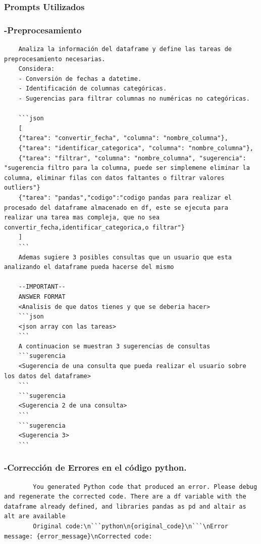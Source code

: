 \begin{anexos}
	\subsubsection{Prompts Utilizados}
	\subsubsection{-Preprocesamiento}
	\begin{lstlisting}
	Analiza la información del dataframe y define las tareas de preprocesamiento necesarias.
	Considera:
	- Conversión de fechas a datetime.
	- Identificación de columnas categóricas.
	- Sugerencias para filtrar columnas no numéricas no categóricas.
	
	```json
	[
	{"tarea": "convertir_fecha", "columna": "nombre_columna"},
	{"tarea": "identificar_categorica", "columna": "nombre_columna"},
	{"tarea": "filtrar", "columna": "nombre_columna", "sugerencia": "sugerencia filtro para la columna, puede ser simplemene eliminar la columna, eliminar filas con datos faltantes o filtrar valores outliers"}
	{"tarea": "pandas","codigo":"codigo pandas para realizar el procesado del dataframe almacenado en df, este se ejecuta para realizar una tarea mas compleja, que no sea convertir_fecha,identificar_categorica,o filtrar"}
	]
	```
	Ademas sugiere 3 posibles consultas que un usuario que esta analizando el dataframe pueda hacerse del mismo
	
	--IMPORTANT--
	ANSWER FORMAT
	<Analisis de que datos tienes y que se deberia hacer>
	```json
	<json array con las tareas>
	```
	A continuacion se muestran 3 sugerencias de consultas
	```sugerencia
	<Sugerencia de una consulta que pueda realizar el usuario sobre los datos del dataframe>
	```
	```sugerencia
	<Sugerencia 2 de una consulta>
	```
	```sugerencia
	<Sugerencia 3>
	```
	\end{lstlisting}
	
	\subsubsection{-Corrección de Errores en el código python.}
	\begin{lstlisting}
		You generated Python code that produced an error. Please debug and regenerate the corrected code. There are a df variable with the dataframe already defined, and libraries pandas as pd and altair as alt are available
		Original code:\n```python\n{original_code}\n```\nError message: {error_message}\nCorrected code:
	\end{lstlisting}
	

\end{anexos}
